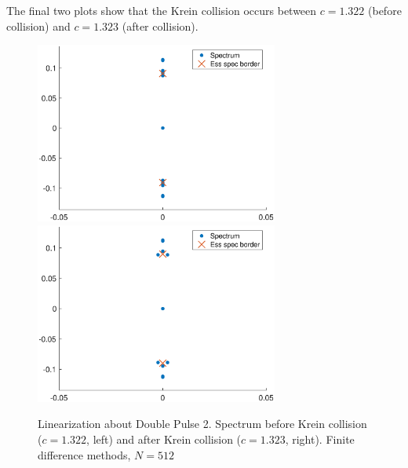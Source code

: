\documentclass[12pt]{article}
\begin{document}
The final two plots show that the Krein collision occurs between $c = 1.322$ (before collision) and $c = 1.323$ (after collision).

\begin{figure}[H]
\centering
\includegraphics[width=8cm]{spec1322_double2.eps}
\includegraphics[width=8cm]{spec1323_double2.eps}
\caption{Linearization about Double Pulse 2. Spectrum before Krein collision ($c = 1.322$, left) and after Krein collision ($c = 1.323$, right). Finite difference methods, $N = 512$}
\end{figure}


\end{document}
